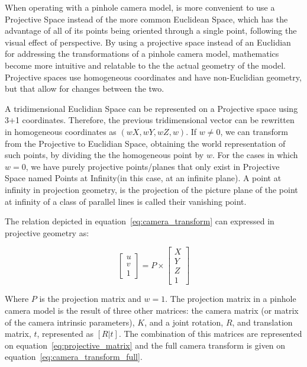 When operating with a pinhole camera model, is more convenient to use a Projective Space instead of the more common Euclidean Space\citeneeded, which has the advantage of all of its points being oriented through a single point, following the visual effect of perspective. By using a projective space instead of an Euclidian for addressing the transformations of a pinhole camera model, mathematics become more intuitive and relatable to the the actual geometry of the model. Projective spaces use homogeneous coordinates and have non-Euclidian geometry, but that allow for changes between the two.

A tridimensional Euclidian Space can be represented on a Projective space using 3+1 coordinates. Therefore, the previous tridimensional vector can be rewritten in homogeneous coordinates as $(wX, wY, wZ, w)$. If $w \neq 0$, we can transform from the Projective to Euclidian Space, obtaining the world representation of such points, by dividing the the homogeneous point by $w$. For the cases in which $w =  0$, we have purely projective points/planes that only exist in Projective Space named Points at Infinity\citeneeded (in this case, at an infinite plane). A point at infinity in projection geometry, is the projection of the picture plane of the point at infinity of a class of parallel lines is called their vanishing point. 


The relation depicted in equation~\ref{eq:camera_transform} can expressed in projective geometry as:

\begin{equation}
	\begin{bmatrix}
		u \\ v \\ 1
	\end{bmatrix}
= P \times 
\begin{bmatrix}
		X \\ Y \\ Z \\ 1
\end{bmatrix}
\end{equation}

Where $P$ is the projection matrix and $w = 1$. The projection matrix in a pinhole camera model is the result of three other matrices: the camera matrix (or matrix of the camera intrinsic parameters), $K$, and a joint rotation, $R$, and translation matrix, $t$, represented as $[R|t]$. The combination of this matrices are represented on equation~\ref{eq:projective_matrix} and the full camera transform is given on equation~\ref{eq:camera_transform_full}.

